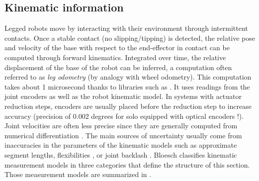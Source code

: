 \subsection{Kinematic information}
\label{sec:kinematic_info}
Legged robots move by interacting with their environment through intermittent contacts.
Once a stable contact (no slipping/tipping) is detected, the relative pose and velocity of the base with respect to the end-effector in contact 
can be computed through forward kinematics. Integrated over time, the relative displacement of the base of the robot can be inferred, a computation 
often referred to as \textit{leg odometry} (by analogy with wheel odometry). This computation takes about 1 microsecond thanks to libraries such as \cite{carpentier2019pinocchio, hereid2017frost}. It uses
readings from the joint encoders as well as the robot kinematic model. In systems with actuator reduction steps, encoders are usually placed before the reduction step 
to increase accuracy (precision of 0.002 degrees for solo equipped with optical encoders \cite{grimminger2020open}!). Joint velocities are often less precise since they are generally computed from numerical differentiation \cite{rotella2016imu}. 
The main sources of uncertainty usually come from inaccuracies in the parameters of the kinematic models such as approximate segment lengths, flexibilities \cite{vigne2018estimation, villa2022addressing}, or 
joint backlash \cite{fallon2014drift, koolen2016design}. 
Bloesch \cite{bloesch2018technical} classifies kinematic measurement models in three categories that define the structure of this section. 
Those measurement models are summarized in .


